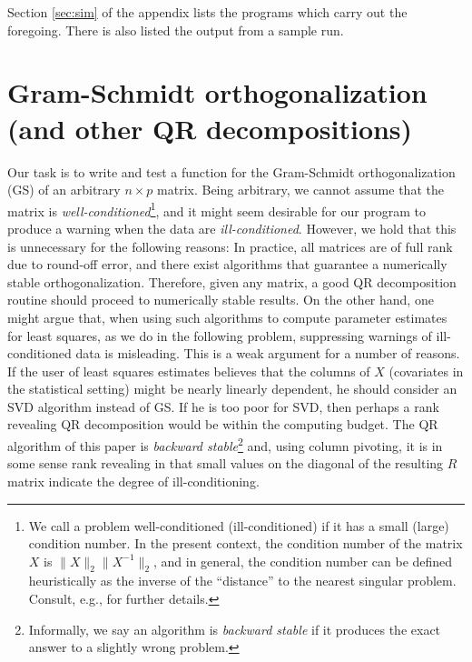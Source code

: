 \documentclass{article}
\begin{document}
Section \ref{sec:sim} of the appendix lists the programs which carry
out the foregoing.  There is also listed the output from a sample run.

\section{Gram-Schmidt orthogonalization (and other QR decompositions)}
Our task is to write and test a function for the Gram-Schmidt
orthogonalization (GS) of an arbitrary $n\times p$ matrix.  Being
arbitrary, we cannot assume that the matrix is 
\emph{well-conditioned}\footnote{We call a problem 
well-conditioned (ill-conditioned) if it
  has a small (large) condition number.  In the present context, the
  condition number of the matrix $X$ is $\|X\|_2\|X^{-1}\|_2$, and in
  general, the condition number can be defined heuristically 
as the inverse of the ``distance'' to the nearest singular problem. 
Consult, e.g., \cite{Demmel} for further details.}, and it
might seem desirable for our program to produce a warning when the data
are \emph{ill-conditioned}.  However, we hold that this is unnecessary for
the following reasons:  In practice, all matrices are of 
full rank due to round-off error, and there exist algorithms 
that guarantee a numerically stable orthogonalization.  Therefore,
given any matrix, a good QR decomposition routine should proceed to 
numerically stable results.  On the other
hand, one might argue that, when using such algorithms to compute parameter
estimates for 
least squares, as we do in the following problem, suppressing 
warnings of ill-conditioned data is misleading.  
This is a weak argument for a number of reasons.  If the user of least
squares estimates believes that the columns of $X$ (covariates in the
statistical setting) might be nearly linearly dependent, he should
consider an SVD algorithm instead of GS.  If he is too poor for SVD,
then perhaps a rank revealing QR decomposition would be within the computing budget.
The QR algorithm of this paper is \emph{backward stable}\footnote{
Informally, we say an algorithm is \emph{backward stable} 
if it produces the exact answer to a slightly wrong
problem.} and, using column pivoting, it is in some sense rank 
revealing in that small values on the diagonal of the resulting $R$ 
matrix indicate the degree of ill-conditioning.
\end{document}
